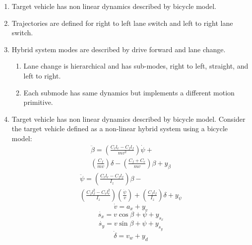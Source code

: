 \begin{enumerate}
	\item Target vehicle has non linear dynamics described by bicycle model.
	\item Trajectories are defined for right to left lane switch and left to right lane switch.
	\item Hybrid system modes are described by drive forward and lane change.
	\begin{enumerate}
		\item Lane change is hierarchical and has sub-modes, right to left, straight, and left to right.
		\item Each submode has same dynamics but implements a different motion primitive.
	\end{enumerate}
	\item Target vehicle has non linear dynamics described by bicycle model.
	Consider the target vehicle defined as a non-linear hybrid system using a  bicycle model:
	\begin{equation}
	\begin{aligned}
	\ddot{\beta}=\left(\frac{C_rl_r-C_fl_f}{mv^2} \right)\dot{\psi}+\\
	\left(\frac{C_f}{mv} \right)\delta-\left(\frac{C_f+C_r}{mv} \right)\beta+y_{\beta}
	\end{aligned}
	\end{equation}
	\begin{equation}
	\begin{aligned}
	\ddot{\psi}=\left(\frac{C_rl_r-C_fl_f}{I_z} \right)\beta-\\
	\left(\frac{C_fl_f^2-C_rl_r^2}{I_z} \right)\left(\frac{\dot{\psi}}{v} \right)+
	\left(\frac{C_fl_f}{I_z} \right)\delta+y_{\dot{\psi}}
	\end{aligned}
	\end{equation}
	\begin{equation}
	\dot{v}=a_x+y_v
	\end{equation}
	\begin{equation}
	\dot{s_x}=v\cos{\beta+\psi}+y_{s_x}
	\end{equation}
	\begin{equation}
	\dot{s_y}=v\sin{\beta+\psi}+y_{s_y}
	\end{equation}
	\begin{equation}
	\dot{\delta}=v_w+y_d
	\end{equation}
	

\end{enumerate}
